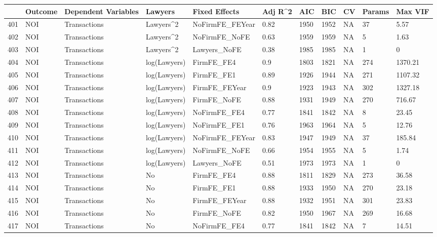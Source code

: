 \documentclass{article}
\begin{document}
\begin{table}[H]
\centering
\begin{tabular}{rllllllllll}
  \hline
 & Outcome & Dependent Variables & Lawyers & Fixed Effects & Adj R^2 & AIC & BIC & CV & Params & Max VIF \\ 
  \hline
401 & NOI & Transactions & Lawyers^2 & NoFirmFE\_FEYear & 0.82 & 1950 & 1952 & NA & 37 & 5.57 \\ 
  402 & NOI & Transactions & Lawyers^2 & NoFirmFE\_NoFE & 0.63 & 1959 & 1959 & NA & 5 & 1.63 \\ 
  403 & NOI & Transactions & Lawyers^2 & Lawyers\_NoFE & 0.38 & 1985 & 1985 & NA & 1 & 0 \\ 
  404 & NOI & Transactions & log(Lawyers) & FirmFE\_FE4 & 0.9 & 1803 & 1821 & NA & 274 & 1370.21 \\ 
  405 & NOI & Transactions & log(Lawyers) & FirmFE\_FE1 & 0.89 & 1926 & 1944 & NA & 271 & 1107.32 \\ 
  406 & NOI & Transactions & log(Lawyers) & FirmFE\_FEYear & 0.9 & 1923 & 1943 & NA & 302 & 1327.18 \\ 
  407 & NOI & Transactions & log(Lawyers) & FirmFE\_NoFE & 0.88 & 1931 & 1949 & NA & 270 & 716.67 \\ 
  408 & NOI & Transactions & log(Lawyers) & NoFirmFE\_FE4 & 0.77 & 1841 & 1842 & NA & 8 & 23.45 \\ 
  409 & NOI & Transactions & log(Lawyers) & NoFirmFE\_FE1 & 0.76 & 1963 & 1964 & NA & 5 & 12.76 \\ 
  410 & NOI & Transactions & log(Lawyers) & NoFirmFE\_FEYear & 0.83 & 1947 & 1949 & NA & 37 & 185.84 \\ 
  411 & NOI & Transactions & log(Lawyers) & NoFirmFE\_NoFE & 0.66 & 1954 & 1955 & NA & 5 & 1.74 \\ 
  412 & NOI & Transactions & log(Lawyers) & Lawyers\_NoFE & 0.51 & 1973 & 1973 & NA & 1 & 0 \\ 
  413 & NOI & Transactions & No & FirmFE\_FE4 & 0.88 & 1811 & 1829 & NA & 273 & 36.58 \\ 
  414 & NOI & Transactions & No & FirmFE\_FE1 & 0.88 & 1933 & 1950 & NA & 270 & 23.18 \\ 
  415 & NOI & Transactions & No & FirmFE\_FEYear & 0.88 & 1932 & 1951 & NA & 301 & 23.83 \\ 
  416 & NOI & Transactions & No & FirmFE\_NoFE & 0.82 & 1950 & 1967 & NA & 269 & 16.68 \\ 
  417 & NOI & Transactions & No & NoFirmFE\_FE4 & 0.77 & 1841 & 1842 & NA & 7 & 14.51 \\ 

\end{tabular}
\end{table}
\end{document}
